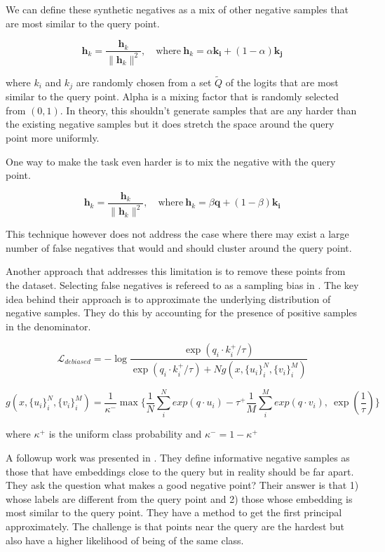 \documentclass[12pt]{article}
\begin{document}
We can define these synthetic negatives as a mix of other negative samples that are most similar to the query point.

$$\mathbf{h}_k = \frac{\mathbf{h}_k}{\lVert \mathbf{h}_k \lVert^{2}}, \quad \text{where} \: \mathbf{h}_k = \alpha \mathbf{k_i} + (1-\alpha) \mathbf{k_j}$$

where $k_i$ and $k_j$ are randomly chosen from a set $\tilde{Q}$ of the logits that are most similar to the query point. Alpha is a mixing factor that is randomly selected from $(0,1)$. In theory, this shouldn't generate samples that are any harder than the existing negative samples but it does stretch the space around the query point more uniformly.

One way to make the task even harder is to mix the negative with the query point.

$$\mathbf{h}_k = \frac{\mathbf{h}_k}{\lVert \mathbf{h}_k \lVert^{2}}, \quad \text{where} \: \mathbf{h}_k = \beta \mathbf{q} + (1-\beta) \mathbf{k_i}$$

This technique however does not address the case where there may exist a large number of false negatives that would and should cluster around the query point.

Another approach that addresses this limitation is to remove these points from the dataset. Selecting false negatives is refereed to as a sampling bias in \cite{chuang_debiased_2020}. The key idea behind their approach is to approximate the underlying distribution of negative samples. They do this by accounting for the presence of positive samples in the denominator.

$$\mathcal{L}_{debiased} = -\log \frac{\exp(q_{i} \cdot k^{+}_{i} / \tau)}{\exp(q_{i} \cdot k^{+}_{i} / \tau) + Ng(x, \{u_i\}^N_i, \{v_i\}^M_i)}$$

$$g(x, \{u_i\}^N_i, \{v_i\}^M_i) = \frac{1}{\kappa^-}\max \{\frac{1}{N} \sum_i^N exp(q \cdot u_i)  - \tau^+\frac{1}{M} \sum_i^M exp(q \cdot v_i), \: \exp(\frac{1}{\tau})\}$$

where $\kappa^+$ is the uniform class probability and $\kappa^- = 1 - \kappa^+$
%

A followup work was presented in \cite{robinson_contrastive_2021}. They define informative negative samples as those that have embeddings close to the query but in reality should be far apart. They ask the question what makes a good negative point? Their answer is that 1) whose labels are different from the query point and 2) those whose embedding is most similar to the query point. They have a method to get the first principal approximately. The challenge is that points near the query are the hardest but also have a higher likelihood of being of the same class.
\end{document}
